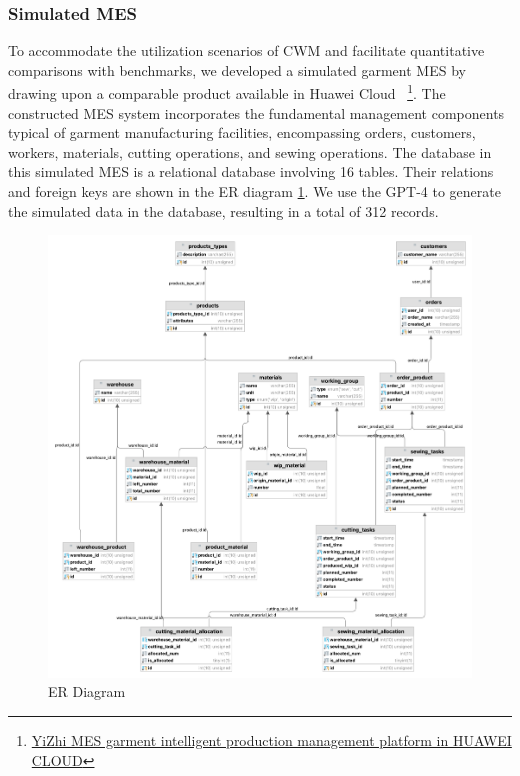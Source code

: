 \documentclass[preprint,12pt]{elsarticle}
\begin{document}
\subsubsection{Simulated MES}
To accommodate the utilization scenarios of CWM and facilitate quantitative comparisons with benchmarks, we developed a simulated garment MES by drawing upon a comparable product available in Huawei Cloud
~\footnote{\href{https://marketplace.huaweicloud.com/contents/da115457-cf31-47e1-bcff-965e5469d360\#productid=00301-608119-0--0}{YiZhi MES garment intelligent production management platform in HUAWEI CLOUD}}.
The constructed MES system incorporates the fundamental management components typical of garment manufacturing facilities, encompassing orders, customers, workers, materials, cutting operations, and sewing operations. 
The database in this simulated MES is a relational database involving 16 tables.
Their relations and foreign keys are shown in the ER diagram \ref{fig:er_diagram}.
We use the GPT-4 to generate the simulated data in the database, resulting in a total of 312 records.
\begin{figure}
        \centering
        \includegraphics[width=1.1\linewidth]{figs/garment.png}
        \caption{ER Diagram}
        \label{fig:er_diagram}
\end{figure}
    
\end{document}
